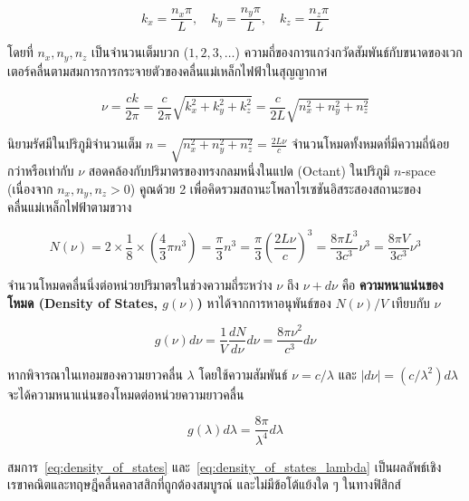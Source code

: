 \begin{equation}
k_x = \frac{n_x \pi}{L}, \quad k_y = \frac{n_y \pi}{L}, \quad k_z = \frac{n_z \pi}{L}
\label{eq:wavevector_components}
\end{equation}

โดยที่ $n_x, n_y, n_z$ เป็นจำนวนเต็มบวก ($1, 2, 3, \dots$) ความถี่ของการแกว่งกวัดสัมพันธ์กับขนาดของเวกเตอร์คลื่นตามสมการการกระจายตัวของคลื่นแม่เหล็กไฟฟ้าในสุญญากาศ

\begin{equation}
\nu = \frac{c k}{2\pi} = \frac{c}{2\pi}\sqrt{k_x^2 + k_y^2 + k_z^2} = \frac{c}{2L}\sqrt{n_x^2 + n_y^2 + n_z^2}
\label{eq:frequency_modes}
\end{equation}

นิยามรัศมีในปริภูมิจำนวนเต็ม $n = \sqrt{n_x^2 + n_y^2 + n_z^2} = \frac{2L\nu}{c}$ จำนวนโหมดทั้งหมดที่มีความถี่น้อยกว่าหรือเท่ากับ $\nu$ สอดคล้องกับปริมาตรของทรงกลมหนึ่งในแปด (Octant) ในปริภูมิ $n$-space (เนื่องจาก $n_x, n_y, n_z > 0$) คูณด้วย 2 เพื่อคิดรวมสถานะโพลาไรเซชันอิสระสองสถานะของคลื่นแม่เหล็กไฟฟ้าตามขวาง

\begin{equation}
N(\nu) = 2 \times \frac{1}{8} \times \left( \frac{4}{3}\pi n^3 \right) = \frac{\pi}{3} n^3 = \frac{\pi}{3} \left( \frac{2L\nu}{c} \right)^3 = \frac{8\pi L^3}{3 c^3} \nu^3 = \frac{8\pi V}{3 c^3} \nu^3
\label{eq:total_modes}
\end{equation}

จำนวนโหมดคลื่นนิ่งต่อหน่วยปริมาตรในช่วงความถี่ระหว่าง $\nu$ ถึง $\nu + d\nu$ คือ \textbf{ความหนาแน่นของโหมด (Density of States, $g(\nu)$)} หาได้จากการหาอนุพันธ์ของ $N(\nu)/V$ เทียบกับ $\nu$

\begin{equation}
g(\nu) d\nu = \frac{1}{V}\frac{dN}{d\nu} d\nu = \frac{8\pi\nu^2}{c^3} d\nu
\label{eq:density_of_states}
\end{equation}

หากพิจารณาในเทอมของความยาวคลื่น $\lambda$ โดยใช้ความสัมพันธ์ $\nu = c/\lambda$ และ $|d\nu| = (c/\lambda^2)d\lambda$ จะได้ความหนาแน่นของโหมดต่อหน่วยความยาวคลื่น

\begin{equation}
g(\lambda) d\lambda = \frac{8\pi}{\lambda^4} d\lambda
\label{eq:density_of_states_lambda}
\end{equation}

สมการ~\eqref{eq:density_of_states} และ~\eqref{eq:density_of_states_lambda} เป็นผลลัพธ์เชิงเรขาคณิตและทฤษฎีคลื่นคลาสสิกที่ถูกต้องสมบูรณ์ และไม่มีข้อโต้แย้งใด ๆ ในทางฟิสิกส์


